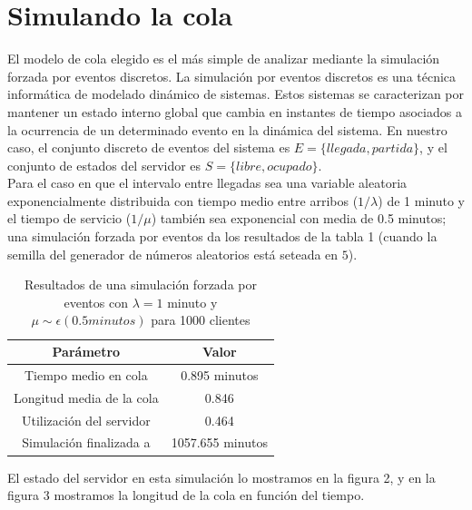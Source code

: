 \documentclass[10pt,journal,compsoc]{IEEEtran}
\begin{document}
\section{Simulando la cola} %
El modelo de cola elegido es el m\'as simple de analizar mediante la simulaci\'on forzada por eventos discretos.
La simulaci\'on por eventos discretos es una t\'ecnica inform\'atica de modelado din\'amico de
sistemas. Estos sistemas se caracterizan por mantener un estado interno global que cambia en instantes
de tiempo asociados a la ocurrencia de un determinado evento en la din\'amica del sistema. En nuestro
caso, el conjunto discreto de eventos del sistema es $E=\{llegada, partida\}$, y el conjunto de estados
del servidor es $S=\{libre, ocupado\}$.\\
Para el caso en que el intervalo entre llegadas sea una variable aleatoria exponencialmente distribuida
con tiempo medio entre arribos ($1/\lambda$) de 1 minuto y el tiempo de servicio ($1/\mu$) tambi\'en sea 
exponencial con media de 0.5 minutos; una simulaci\'on forzada por eventos da los resultados de la tabla 1 
(cuando la semilla del generador de n\'umeros aleatorios est\'a seteada en $5$).\\

\begin{table}[!t]
\renewcommand{\arraystretch}{1.3}
\centering
\begin{tabular}{c c}
\hline
\hline
Par\'ametro  				&	Valor			\\
\hline
Tiempo medio en cola		&	0.895 minutos	\\
Longitud media de la cola	&	0.846			\\
Utilizaci\'on del servidor	&	0.464			\\
Simulaci\'on finalizada a	&	1057.655 minutos\\
\hline
\hline
\end{tabular}
\label{tab:sim}
\caption{Resultados de una simulaci\'on forzada por eventos con $\lambda = 1$ minuto y $\mu \sim \epsilon(0.5 minutos)$ para 1000 clientes}
\end{table}

El estado del servidor en esta simulaci\'on lo mostramos en la figura 2, y en la figura 3 mostramos
la longitud de la cola en funci\'on del tiempo.
\end{document}
